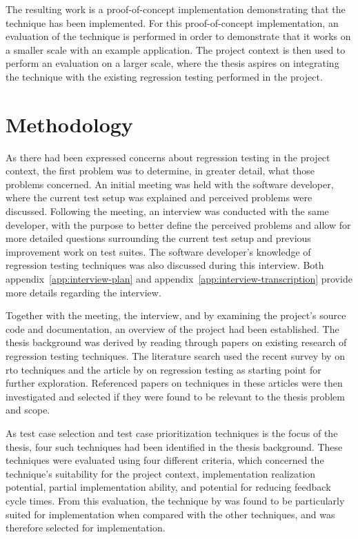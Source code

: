 \documentclass[a4paper,english,12pt]{report}
\begin{document}
The resulting work is a proof-of-concept implementation demonstrating that the technique has been implemented. For this proof-of-concept implementation, an evaluation of the technique is performed in order to demonstrate that it works on a smaller scale with an example application. The project context is then used to perform an evaluation on a larger scale, where the thesis aspires on integrating the technique with the existing regression testing performed in the project.

\section{Methodology}\label{sec:methodology}
As there had been expressed concerns about regression testing in the project context, the first problem was to determine, in greater detail, what those problems concerned. An initial meeting was held with the software developer, where the current test setup was explained and perceived problems were discussed. Following the meeting, an interview was conducted with the same developer, with the purpose to better define the perceived problems and allow for more detailed questions surrounding the current test setup and previous improvement work on test suites. The software developer's knowledge of regression testing techniques was also discussed during this interview. Both appendix~\ref{app:interview-plan} and appendix~\ref{app:interview-transcription} provide more details regarding the interview.

Together with the meeting, the interview, and by examining the project's source code and documentation, an overview of the project had been established. The thesis background was derived by reading through papers on existing research of regression testing techniques. The literature search used the recent survey by \citet{anwar2014exploration} on \gls{rto} techniques and the article by \citet{runeson2012regression} on regression testing as starting point for further exploration. Referenced papers on techniques in these articles were then investigated and selected if they were found to be relevant to the thesis problem and scope.

As test case selection and test case prioritization techniques is the focus of the thesis, four such techniques had been identified in the thesis background. These techniques were evaluated using four different criteria, which concerned the technique's suitability for the project context, implementation realization potential, partial implementation ability, and potential for reducing feedback cycle times. From this evaluation, the technique by \citet{mansour2009regression} was found to be particularly suited for implementation when compared with the other techniques, and was therefore selected for implementation.
\end{document}
